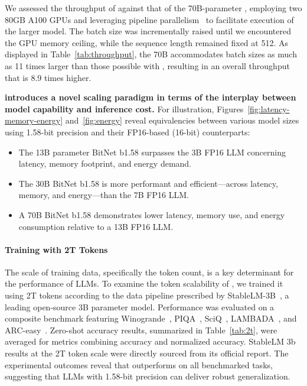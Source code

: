 We assessed the throughput of  against that of the 70B-parameter , employing two 80GB A100 GPUs and leveraging pipeline parallelism~\cite{gpipe} to facilitate execution of the larger  model. The batch size was incrementally raised until we encountered the GPU memory ceiling, while the sequence length remained fixed at 512. As displayed in Table~\ref{tab:throughput}, the 70B  accommodates batch sizes as much as 11 times larger than those possible with , resulting in an overall throughput that is 8.9 times higher.

\textbf{ introduces a novel scaling paradigm in terms of the interplay between model capability and inference cost.} For illustration, Figures~\ref{fig:latency-memory-energy} and~\ref{fig:energy} reveal equivalencies between various model sizes using 1.58-bit precision and their FP16-based (16-bit) counterparts:

\begin{itemize}
    \item The 13B parameter BitNet b1.58 surpasses the 3B FP16 LLM concerning latency, memory footprint, and energy demand.
    \item The 30B BitNet b1.58 is more performant and efficient—across latency, memory, and energy—than the 7B FP16 LLM.
    \item A 70B BitNet b1.58 demonstrates lower latency, memory use, and energy consumption relative to a 13B FP16 LLM.
\end{itemize}

\paragraph{Training with 2T Tokens}

The scale of training data, specifically the token count, is a key determinant for the performance of LLMs. To examine the token scalability of , we trained it using 2T tokens according to the data pipeline prescribed by StableLM-3B~\cite{StableLM-3B-4E1T}, a leading open-source 3B parameter model. Performance was evaluated on a composite benchmark featuring Winogrande~\cite{winoGrande}, PIQA~\cite{piqa}, SciQ~\cite{sciq}, LAMBADA~\cite{lambada}, and ARC-easy~\cite{arc}. Zero-shot accuracy results, summarized in Table~\ref{tab:2t}, were averaged for metrics combining accuracy and normalized accuracy. StableLM 3b results at the 2T token scale were directly sourced from its official report. The experimental outcomes reveal that  outperforms on all benchmarked tasks, suggesting that LLMs with 1.58-bit precision can deliver robust generalization.

